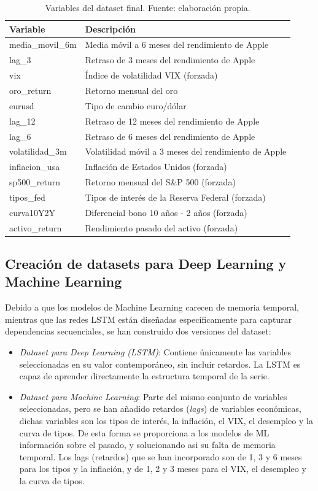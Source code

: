 \begin{table}[H]
\centering
\begin{tabular}{|p{5cm}|p{9.5cm}|}
\hline
\textbf{Variable} & \textbf{Descripción} \\
\hline
media\_movil\_6m & Media móvil a 6 meses del rendimiento de Apple \\
\hline
lag\_3 & Retraso de 3 meses del rendimiento de Apple \\
\hline
vix & Índice de volatilidad VIX (forzada) \\
\hline
oro\_return & Retorno mensual del oro \\
\hline
eurusd & Tipo de cambio euro/dólar \\
\hline
lag\_12 & Retraso de 12 meses del rendimiento de Apple \\
\hline
lag\_6 & Retraso de 6 meses del rendimiento de Apple \\
\hline
volatilidad\_3m & Volatilidad móvil a 3 meses del rendimiento de Apple \\
\hline
inflacion\_usa & Inflación de Estados Unidos (forzada) \\
\hline
sp500\_return & Retorno mensual del S\&P 500 (forzada) \\
\hline
tipos\_fed & Tipos de interés de la Reserva Federal (forzada) \\
\hline
curva10Y2Y & Diferencial bono 10 años - 2 años (forzada) \\
\hline
activo\_return & Rendimiento pasado del activo (forzada) \\
\hline
\end{tabular}
\label{tab:dataset_final}
\caption{Variables del dataset final. Fuente: elaboración propia.}
\end{table}

\subsection{Creación de datasets para Deep Learning y Machine Learning}
\label{sec:dataset_final}
Debido a que los modelos de Machine Learning carecen de memoria temporal, mientras que las redes LSTM están diseñadas específicamente para capturar dependencias secuenciales, se han construido dos versiones del dataset:

\begin{itemize}
    \item \emph{Dataset para Deep Learning (LSTM)}: Contiene únicamente las variables seleccionadas en su valor contemporáneo, sin incluir retardos. La LSTM es capaz de aprender directamente la estructura temporal de la serie.
    \item \emph{Dataset para Machine Learning}: Parte del mismo conjunto de variables seleccionadas, pero se han añadido retardos (\textit{lags}) de variables económicas, dichas variables son los tipos de interés, la inflación, el VIX, el desempleo y la curva de tipos. De esta forma se proporciona a los modelos de ML información sobre el pasado, y solucionando asi su falta de memoria temporal. Los lags (retardos) que se han incorporado son de 1, 3 y 6 meses para los tipos y la inflación, y de 1, 2 y 3 meses para el VIX, el desempleo y la curva de tipos.
\end{itemize}

